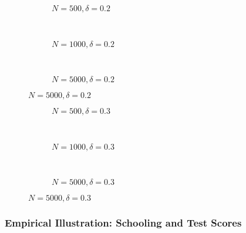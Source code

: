 \documentclass{beamer}
\begin{document}
\begin{frame}
\begin{figure}[h]
  \scriptsize
  \begingroup
  \centering
  \begin{subfigure}[b]{0.31\textwidth}
\caption{\footnotesize $N=500, \delta = 0.2$}
  
  \end{subfigure}
  ~
  \begin{subfigure}[b]{0.31\textwidth}
    \caption{\footnotesize $N=1000, \delta = 0.2$} 
  
  \end{subfigure}
 ~ 
  \begin{subfigure}[b]{0.31\textwidth}
\caption{\footnotesize $N=5000, \delta = 0.2$}
  
  \end{subfigure}
\endgroup
\end{figure}
\end{frame}
\begin{frame}
\begin{figure}[h]
  \scriptsize
  \begingroup
  \centering
  \begin{subfigure}[b]{0.31\textwidth}
\caption{\footnotesize $N=500, \delta = 0.3$}
  
  \end{subfigure}
  ~
  \begin{subfigure}[b]{0.31\textwidth}
    \caption{\footnotesize $N=1000, \delta = 0.3$} 
  
  \end{subfigure}
 ~ 
  \begin{subfigure}[b]{0.31\textwidth}
\caption{\footnotesize $N=5000, \delta = 0.3$}
  
  \end{subfigure}
\endgroup
\end{figure}
\end{frame}
\begin{frame}
  \frametitle{Empirical Illustration: Schooling and Test Scores}
\end{frame}
\end{document}
